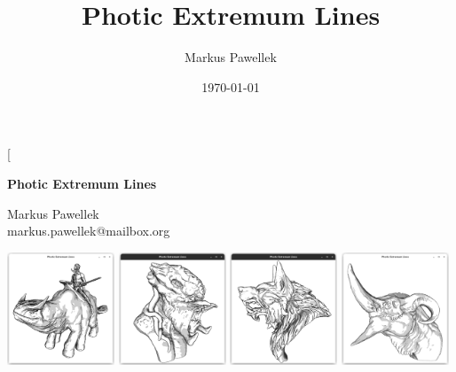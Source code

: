 \documentclass[9pt,fleqn,twoside,twocolumn]{stdglobal}
\title{Photic Extremum Lines}
\author{Markus Pawellek}
\date{\today}
\begin{document}

\thispagestyle{titlepagestyle}

\twocolumn[{\begin{@twocolumnfalse}%
  \begin{center}
    \Large
    \bfseries
    Photic Extremum Lines
  \end{center}%
  \vspace{1pt}
  \begin{center}
    Markus Pawellek \\
    markus.pawellek@mailbox.org
  \end{center}
  \vspace{1em}
  \begin{center}
    \includegraphics[width=0.24\textwidth,trim={15px 15 15 50},clip]{images/rider.png}
    \hfill
    \includegraphics[width=0.24\textwidth,trim={15px 15 15 50},clip]{images/predator-intro.png}
    \hfill
    \includegraphics[width=0.24\textwidth,trim={15px 15 15 50},clip]{images/werewolf-intro.png}
    \hfill
    \includegraphics[width=0.24\textwidth,trim={15px 15 15 50},clip]{images/dragon-head-contour-pel-toon-shader.png}

\end{center}
\end{@twocolumnfalse}}
\end{document}
